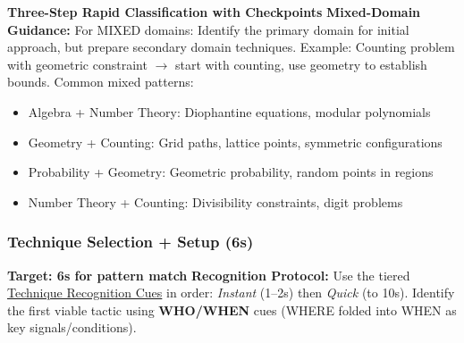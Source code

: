 \documentclass{article}
\newcommand{\immediateaction}[1]{\textbf{\textcolor{classifyred}{#1}}}
\begin{document}
\begin{classifybox}{\immediateaction{Three-Step Rapid Classification with Checkpoints}}
\textbf{Mixed-Domain Guidance:} For MIXED domains: Identify the primary domain for initial approach, but prepare secondary domain techniques. Example: Counting problem with geometric constraint $\rightarrow$ start with counting, use geometry to establish bounds. Common mixed patterns:
\begin{itemize}[nosep]
\item Algebra + Number Theory: Diophantine equations, modular polynomials
\item Geometry + Counting: Grid paths, lattice points, symmetric configurations
\item Probability + Geometry: Geometric probability, random points in regions
\item Number Theory + Counting: Divisibility constraints, digit problems
\end{itemize}

\subsubsection{Technique Selection + Setup (6s)}\hypertarget{technique-setup}{}
{\footnotesize\textcolor{timegreen}{}}\quad\textbf{Target: 6s for pattern match}
\textbf{Recognition Protocol:} Use the tiered \hyperlink{ircues}{Technique Recognition Cues} in order: \textit{Instant} (1--2s) then \textit{Quick} (to 10s). Identify the first viable tactic using \textbf{WHO/WHEN} cues (WHERE folded into WHEN as key signals/conditions).\\


\end{classifybox}
\end{document}
